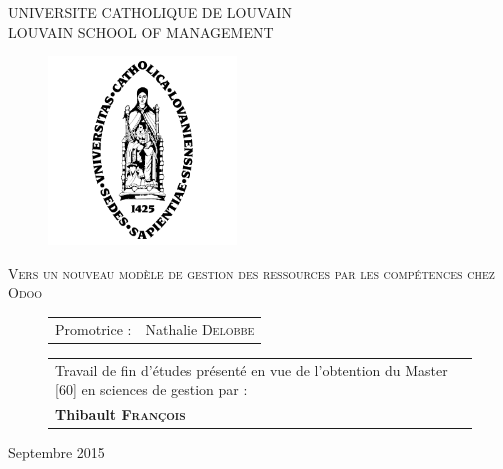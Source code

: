 \parindent=0cm



\begin{center}
{\large    UNIVERSITE CATHOLIQUE DE LOUVAIN \\
LOUVAIN SCHOOL OF MANAGEMENT \\
}
   \end{center}
\vfill

 \begin{figure}[H]
\begin{center}  \hspace*{-10mm} 
	\includegraphics[height = 5cm]{alma.png}
   \end{center}
\end{figure}


\vfill


\begin{center}
{\Large \textsc{Vers un nouveau modèle de gestion des ressources par les compétences chez Odoo}}
\end{center}



\vfill

 \begin{figure}[H]
 \begin{minipage}[c]{.45\linewidth}
		\begin{tabular}{ll}
		Promotrice : & Nathalie \textsc{Delobbe} \\

		\end{tabular}
\end{minipage} \hfill
 \begin{minipage}[c]{.45\linewidth}
 \begin{tabularx}{\linewidth}{p{\textwidth}}
Travail de fin d'études présenté en vue de \hbox{l'obtention} du Master [60] en sciences de gestion par :\\
\textbf{Thibault \textsc{François}}

\end{tabularx}
\end{minipage}
\end{figure}

\vspace{1,5cm}



\begin{center}
{\large Septembre 2015}
\end{center}
